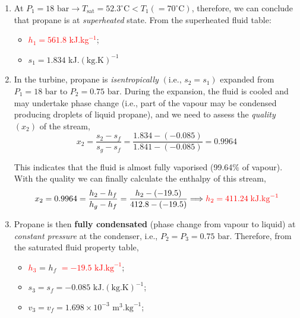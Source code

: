 \documentclass[12pts,a4paper,amsmath,amssymb,floatfix]{article}%
\newcommand{\frc}{\displaystyle\frac}
\newcommand{\red}{\textcolor{red}}
\begin{document}
\begin{enumerate}[label=\bfseries Stage \arabic*:]
%

\item At $P_{1}=18\text{ bar} \longrightarrow T_{\text{sat}}=52.3^{\circ}\text{C} < T_{1}\left(=70^{\circ}\text{C}\right)$, therefore, we can conclude that propane is at {\it superheated} state. From the superheated fluid table:
\begin{itemize}
  \item \red{$h_{1} = 561.8$ kJ.kg$^{-1}$};
  \item $s_{1} = 1.834$ kJ.$\left(\text{kg.K}\right)^{-1}$
\end{itemize}
%

\item In the turbine, propane is {\it isentropically} $\left(\text{i.e., } s_{2} = s_{1}\right)$ expanded from $P_{1}=18\text{ bar}$ to $P_{2}=0.75\text{ bar}$. During the expansion, the fluid is cooled and may undertake phase change (i.e., part of the vapour may be condensed producing droplets of liquid propane), and we need to assess the {\it quality} $\left(x_{2}\right)$ of the stream,
\begin{displaymath}
  x_{2} = \frc{s_{2}-s_{f}}{s_{g}-s_{f}} = \frc{1.834-(-0.085)}{1.841-(-0.085)} = 0.9964
\end{displaymath}

This indicates that the fluid is almost fully vaporised (99.64$\%$ of vapour). With the quality we can finally calculate the enthalpy of this stream,
\begin{displaymath}
  x_{2} = 0.9964 = \frc{h_{2}-h_{f}}{h_{g}-h_{f}} = \frc{h_{2} - (-19.5)}{412.8 - (-19.5)} \Longrightarrow \red{h_{2} = 411.24\; \text{kJ.kg}^{-1}} 
\end{displaymath} 
%
\item Propane is then {\bf fully condensated} (phase change from vapour to liquid) at {\it constant pressure} at the condenser, i.e., $P_{2}=P_{3}=0.75\text{ bar}$. Therefore, from the saturated fluid property table,
\begin{itemize}
   \item \red{$h_{3}$} = $h_{f}$ \red{$= -19.5 \text{ kJ.kg}^{-1}$};
   \item $s_{3} = s_{f} = -0.085\text{ kJ.}\left(\text{kg.K}\right)^{-1}$;
   \item $v_{3} = v_{f} = 1.698\times 10^{-3}\text{ m}^{3}\text{.kg}^{-1}$;
\end{itemize}
%


\end{enumerate}
\end{document}
